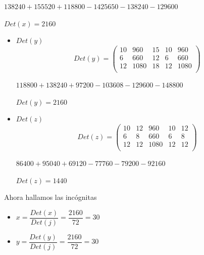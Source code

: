 \documentclass[11pt,a4paper]{article}
\begin{document}
\begin{enumerate}
\begin{itemize}
\begin{center}
    $138240 + 155520 + 118800 - 1425650 - 138240 - 129600$
    
    $Det(x)= 2160$
\end{center}

\end{itemize}


\begin{itemize}
\item $Det(y)$
$$
Det(y)= 
\left(\begin{array}{ccc|cc}  
 10 & 960 & 15 & 10 & 960 \\  
 6 & 660 & 12 & 6 & 660 \\ 
 12 & 1080 & 18 & 12 & 1080 \\ 
\end{array}\right)
$$

\begin{center}
    $118800 + 138240 + 97200 - 103608 - 129600 - 148800$
    
    $Det(y)= 2160$
\end{center}

\end{itemize}


\begin{itemize}
\item $Det(z)$
$$
Det(z)= 
\left(\begin{array}{ccc|cc}  
 10 & 12 & 960 & 10 & 12 \\  
 6 & 8 & 660 & 6 & 8 \\ 
 12 & 12 & 1080 & 12 & 12 \\ 
\end{array}\right)
$$

\begin{center}
    $86400 + 95040 + 69120 - 77760 - 79200 - 92160$
    
    $Det(z)= 1440$
\end{center}

\end{itemize}


Ahora hallamos las incógnitas

\begin{itemize}
\item $x = \dfrac{Det(x)}{Det(j)} = \dfrac{2160}{72} = 30 $
\end{itemize}

\begin{itemize}
\item $y = \dfrac{Det(y)}{Det(j)} = \dfrac{2160}{72} = 30 $
\end{itemize}


\end{enumerate}
\end{document}
